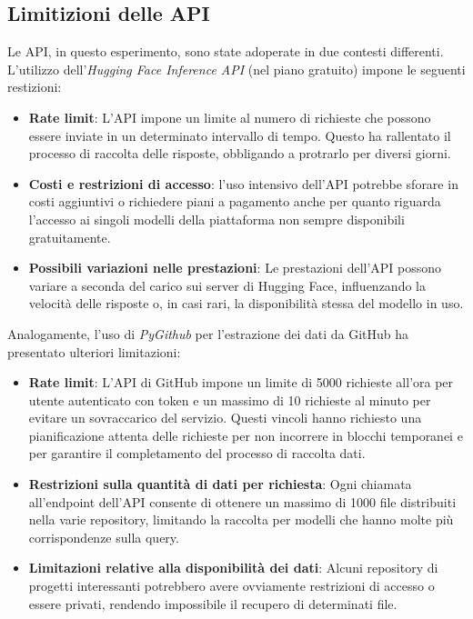 \documentclass{article}
\begin{document}
\subsection{Limitizioni delle API}
Le API, in questo esperimento, sono state adoperate in due contesti differenti.\\
L'utilizzo dell’\textit{Hugging Face Inference API} (nel piano gratuito) impone le seguenti restizioni:
\begin{itemize}
    \item \textbf{Rate limit}: L’API impone un limite al numero di richieste che possono essere inviate in un determinato intervallo di tempo. Questo ha rallentato il processo di raccolta delle risposte, obbligando a protrarlo per diversi giorni. 
    \item \textbf{Costi e restrizioni di accesso}: l'uso intensivo dell'API potrebbe sforare in costi aggiuntivi o richiedere piani a pagamento anche per quanto riguarda l'accesso ai singoli modelli della piattaforma non sempre disponibili gratuitamente.
    \item \textbf{Possibili variazioni nelle prestazioni}: Le prestazioni dell’API possono variare a seconda del carico sui server di Hugging Face, influenzando la velocità delle risposte o, in casi rari, la disponibilità stessa del modello in uso.
\end{itemize}
Analogamente, l'uso di \textit{PyGithub} per l'estrazione dei dati da GitHub ha presentato ulteriori limitazioni:
\begin{itemize}
\item \textbf{Rate limit}: L'API di GitHub impone un limite di 5000 richieste all'ora per utente autenticato con token e un massimo di 10 richieste al minuto per evitare un sovraccarico del servizio. Questi vincoli hanno richiesto una pianificazione attenta delle richieste per non incorrere in blocchi temporanei e per garantire il completamento del processo di raccolta dati.
\item \textbf{Restrizioni sulla quantità di dati per richiesta}: Ogni chiamata all'endpoint dell'API consente di ottenere un massimo di 1000 file distribuiti nella varie repository, limitando la raccolta per modelli che hanno molte più corrispondenze sulla query.
\item \textbf{Limitazioni relative alla disponibilità dei dati}: Alcuni repository di progetti interessanti potrebbero avere ovviamente restrizioni di accesso o essere privati, rendendo impossibile il recupero di determinati file.
\end{itemize}
\end{document}
